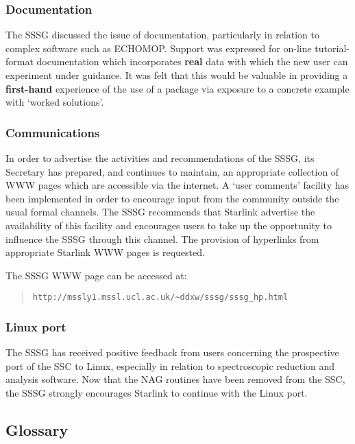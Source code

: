 \subsubsection{Documentation}

The SSSG discussed the issue of documentation, particularly in
relation to complex software such as ECHOMOP.  Support was expressed
for on-line tutorial-format documentation which incorporates {\bf real}
data with which the new user can experiment under guidance. It was
felt that this would be valuable in providing a {\bf first-hand}
experience of the use of a package via exposure to a concrete example
with `worked solutions'.

\subsubsection{Communications}

In order to advertise the activities and recommendations of the SSSG,
its Secretary has prepared, and continues to maintain, an appropriate
collection of WWW pages which are accessible via the internet.  A
`user comments' facility has been implemented in order to encourage
input from the community outside the usual formal channels.  The SSSG
recommends that Starlink advertise the availability of this facility
and encourages users to take up the opportunity to influence the SSSG
through this channel.  The provision of hyperlinks from appropriate
Starlink WWW pages is requested.

The SSSG WWW page can be accessed at:
\begin{quote}
\begin{verbatim}
http://mssly1.mssl.ucl.ac.uk/~ddxw/sssg/sssg_hp.html
\end{verbatim}
\end{quote}

\subsubsection{\label{specSSG:PC}Linux port}

The SSSG has received positive feedback from users concerning the
prospective port of the SSC to Linux, especially in relation to
spectroscopic reduction and analysis software.  Now that the NAG
routines have been removed from the SSC, the SSSG strongly encourages
Starlink to continue with the Linux port.

\subsection{Glossary}

